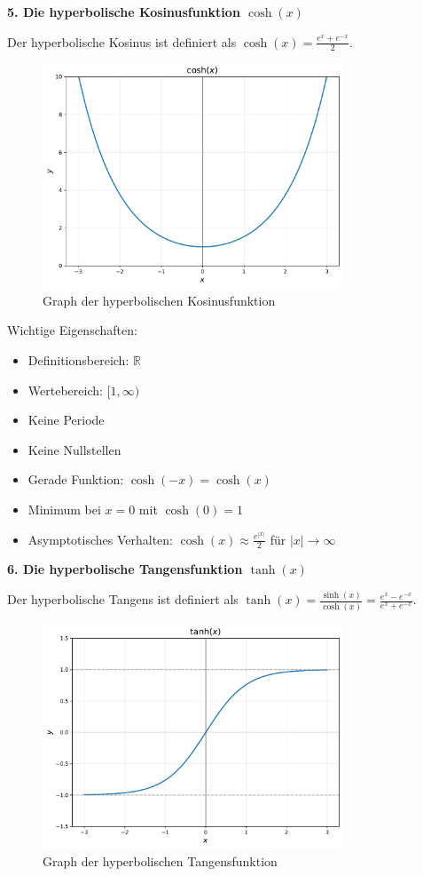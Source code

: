 \documentclass{article}
\begin{document}
\textbf{5. Die hyperbolische Kosinusfunktion $\cosh(x)$}

Der hyperbolische Kosinus ist definiert als $\cosh(x) = \frac{e^x + e^{-x}}{2}$.

\begin{figure}[!htbp]
\centering
\includegraphics[width=0.8\textwidth]{cosh.pdf}
\caption{Graph der hyperbolischen Kosinusfunktion}
\end{figure}

Wichtige Eigenschaften:
\begin{itemize}
\item Definitionsbereich: $\mathbb{R}$
\item Wertebereich: $[1, \infty)$
\item Keine Periode
\item Keine Nullstellen
\item Gerade Funktion: $\cosh(-x) = \cosh(x)$
\item Minimum bei $x = 0$ mit $\cosh(0) = 1$
\item Asymptotisches Verhalten: $\cosh(x) \approx \frac{e^{|x|}}{2}$ für $|x| \to \infty$
\end{itemize}

\textbf{6. Die hyperbolische Tangensfunktion $\tanh(x)$}

Der hyperbolische Tangens ist definiert als $\tanh(x) = \frac{\sinh(x)}{\cosh(x)} = \frac{e^x - e^{-x}}{e^x + e^{-x}}$.

\begin{figure}[!htbp]
\centering
\includegraphics[width=0.8\textwidth]{tanh.pdf}
\caption{Graph der hyperbolischen Tangensfunktion}
\end{figure}
\end{document}
